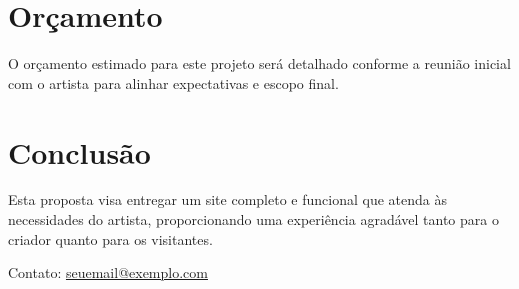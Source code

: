 \documentclass[a4paper,12pt]{article}
\begin{document}
\section*{Orçamento}
O orçamento estimado para este projeto será detalhado conforme a reunião inicial com o artista para alinhar expectativas e escopo final.

\section*{Conclusão}
Esta proposta visa entregar um site completo e funcional que atenda às necessidades do artista, proporcionando uma experiência agradável tanto para o criador quanto para os visitantes.

\vfill
\noindent Contato: \href{mailto:seuemail@exemplo.com}{seuemail@exemplo.com} 
\end{document}
